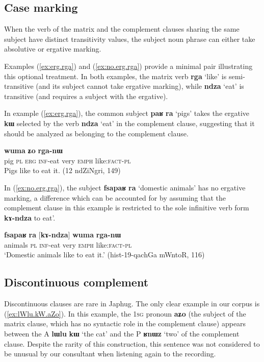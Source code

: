 \documentclass[oneside,a4paper,11pt]{article}
\newcommand{\ipa}[1]{\textbf{\phon#1}} %
\newcommand{\jpg}[2]{\ipa{#1} `#2'} %
\begin{document}
\subsection{Case marking}
When the verb of the matrix and the complement clauses sharing the same subject have distinct transitivity values, the subject noun phrase can either take absolutive or ergative marking. 

Examples (\ref{ex:erg.rga}) and (\ref{ex:no.erg.rga}) provide a minimal pair illustrating this optional treatment. In both examples, the matrix verb \jpg{rga}{like} is semi-transitive (and its subject cannot take ergative marking), while \jpg{ndza}{eat} is transitive (and requires a subject with the ergative).

In example (\ref{ex:erg.rga}), the common subject \ipa{paʁ} \ipa{ra}  `pigs' takes the ergative \ipa{kɯ} selected by the verb  \jpg{ndza}{eat} in the complement clause, suggesting that it should be analyzed as belonging to the complement clause.

\begin{exe}
\ex \label{ex:erg.rga}
\gll
[\ipa{paʁ}  	\ipa{ra}  	\ipa{kɯ}  	\ipa{kɤ-ndza}]  	\ipa{wuma}  	\ipa{ʑo}  	\ipa{rga-nɯ}  \\
pig \textsc{pl} \textsc{erg} \textsc{inf}-eat very \textsc{emph}  like:\textsc{fact}-\textsc{pl} \\
 \glt Pigs like to eat it. (12 ndZiNgri, 149)
\end{exe}

In (\ref{ex:no.erg.rga}), the subject \ipa{fsapaʁ} 	\ipa{ra} `domestic animals' has no ergative marking, a difference which can be accounted for by assuming that the  complement clause in this example is restricted to the sole infinitive verb form \ipa{kɤ-ndza}   to eat'.

\begin{exe}
\ex \label{ex:no.erg.rga}
\gll \ipa{fsapaʁ} 	\ipa{ra} 	[\ipa{kɤ-ndza}] 	\ipa{wuma} 	\ipa{rga-nɯ}  \\
animals \textsc{pl}  \textsc{inf}-eat very \textsc{emph}  like:\textsc{fact}-\textsc{pl} \\
\glt `Domestic animals like to eat it.' (hist-19-qachGa mWntoR, 116)
\end{exe}
 

\subsection{Discontinuous complement} 

Discontinuous clauses are rare in Japhug. The only clear example in our corpus is (\ref{ex:lWlu.kW.aZo}). In this example, the \textsc{1sg} pronoun \ipa{aʑo} (the subject of the matrix clause, which has no syntactic role in the complement clause) appears between the A \ipa{lɯlu} 	\ipa{kɯ} `the cat' and the P \ipa{ʁnɯz} `two' of the complement clause. Despite the rarity of this construction, this sentence was not considered to be unusual by our consultant when listening again to the recording.
 
\end{document}
